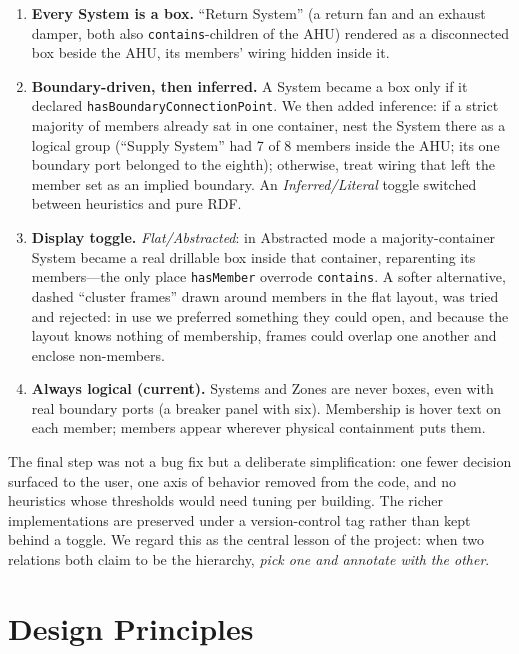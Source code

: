 \documentclass[10pt,twocolumn]{article}
\newcommand{\pred}[1]{\texttt{#1}}   %
\begin{document}
\begin{enumerate}[leftmargin=*,itemsep=1pt]
  \item \textbf{Every System is a box.} ``Return System'' (a return fan and an
  exhaust damper, both also \pred{contains}-children of the AHU) rendered as a
  disconnected box beside the AHU, its members' wiring hidden inside it.
  \item \textbf{Boundary-driven, then inferred.} A System became a box only if it
  declared \pred{hasBoundaryConnectionPoint}. We then added inference: if a strict
  majority of members already sat in one container, nest the System there as a
  logical group (``Supply System'' had 7 of 8 members inside the AHU; its one
  boundary port belonged to the eighth); otherwise, treat wiring that left the
  member set as an implied boundary. An \emph{Inferred/Literal} toggle switched
  between heuristics and pure RDF.
  \item \textbf{Display toggle.} \emph{Flat/Abstracted}: in Abstracted mode a
  majority-container System became a real drillable box inside that container,
  reparenting its members---the only place \pred{hasMember} overrode
  \pred{contains}. A softer alternative, dashed ``cluster frames'' drawn around
  members in the flat layout, was tried and rejected: in use we preferred something
  they could open, and because the layout knows nothing of membership, frames
  could overlap one another and enclose non-members.
  \item \textbf{Always logical (current).} Systems and Zones are never boxes,
  even with real boundary ports (a breaker panel with six). Membership is
  hover text on each member; members appear wherever physical containment puts
  them.
\end{enumerate}

The final step was not a bug fix but a deliberate simplification: one fewer
decision surfaced to the user, one axis of behavior removed from the code, and
no heuristics whose thresholds would need tuning per building. The richer
implementations are preserved under a version-control tag rather than kept
behind a toggle. We regard this as the central lesson of the project: when two
relations both claim to be the hierarchy, \emph{pick one and annotate with the
other}.

\section{Design Principles}
\label{sec:principles}
\end{document}
